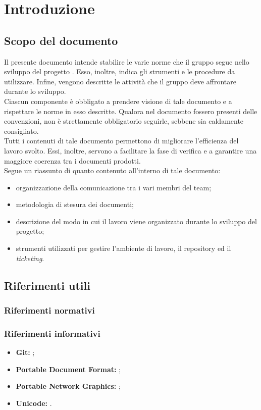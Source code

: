 \section{Introduzione}
	\subsection{Scopo del documento}
		Il presente documento intende stabilire le varie norme che il gruppo \groupname{} segue nello sviluppo del progetto \projectname{}. Esso, inoltre, indica gli strumenti e le procedure da utilizzare. Infine, vengono descritte le attività che il gruppo deve affrontare durante lo sviluppo.\\
		Ciascun componente è obbligato a prendere visione di tale documento e a rispettare le norme in esso descritte. Qualora nel documento fossero presenti delle convenzioni, non è strettamente obbligatorio seguirle, sebbene sia caldamente consigliato.\\
		Tutti i contenuti di tale documento permettono di migliorare l’efficienza del lavoro svolto. Essi, inoltre, servono a facilitare la fase di verifica e a garantire una maggiore coerenza tra i documenti prodotti.\\
		Segue un riassunto di quanto contenuto all'interno di tale documento:
		\begin{itemize}
			\item organizzazione della comunicazione tra i vari membri del team;
			\item metodologia di stesura dei documenti;
			\item descrizione del modo in cui il lavoro viene organizzato durante lo sviluppo del progetto;
			\item strumenti utilizzati per gestire l'ambiente di lavoro, il repository ed il \textit{ticketing}.
		\end{itemize}

	
	

	\subsection{Riferimenti utili}
		\subsubsection{Riferimenti normativi}
		\subsubsection{Riferimenti informativi}
			\begin{itemize}
				\item \textbf{Git:} ;
				\item \textbf{Portable Document Format:} ;
				\item \textbf{Portable Network Graphics:} ;
				\item \textbf{Unicode:} .
			\end{itemize}